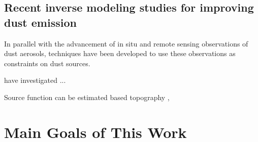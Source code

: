 \subsection{Recent inverse modeling studies for improving dust emission}

 In parallel with the advancement of in situ and remote sensing observations 
 of dust aerosols, techniques have been developed to use these observations 
 as constraints on dust sources.

\citet{koven08} have investigated ...

 Source function can be estimated based topography \citep{ginoux01}, 

\section{Main Goals of This Work}

